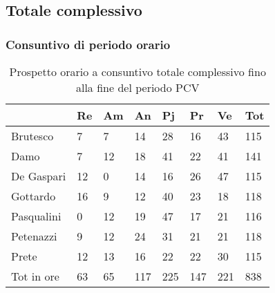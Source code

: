 	\newpage
	\subsection{Totale complessivo}
		\subsubsection{Consuntivo di periodo orario}

						\begin{table}[h] \begin{center} \begin{tabular}{llllllll}																					
						\toprule																					
							&	Re		&	Am		&	An		&	Pj		&	Pr		&	Ve		&	Tot	\\
						\midrule																					
						Brutesco	&	7		&	7		&	14		&	28		&	16		&	43		&	115	\\
						Damo	&	7		&	12		&	18		&	41		&	22		&	41		&	141	\\
						De Gaspari	&	12		&	0		&	14		&	16		&	26		&	47		&	115	\\
						Gottardo	&	16		&	9		&	12		&	40		&	23		&	18		&	118	\\
						Pasqualini	&	0		&	12		&	19		&	47		&	17		&	21		&	116	\\
						Petenazzi	&	9		&	12		&	24		&	31		&	21		&	21		&	118	\\
						Prete	&	12		&	13		&	16		&	22		&	22		&	30		&	115	\\
						\midrule																					
						Tot in ore	&	63		&	65		&	117		&	225		&	147		&	221		&	838	\\
						\bottomrule																					
						\end{tabular} \end{center} \caption{Prospetto orario a consuntivo totale complessivo fino alla fine del periodo PCV															
						} \end{table}
